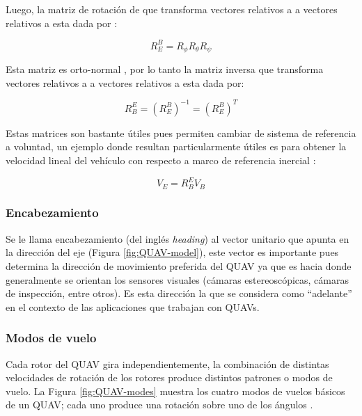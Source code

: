 Luego, la matriz de rotación  de que transforma vectores relativos a  a vectores relativos a  esta dada por \cite{multidrone2015modeling}:


\begin{equation}
    \label{eq:euler-transform}
    R_{E}^{B} = R_{\phi}R_{\theta}R_{\psi}
\end{equation}

Esta matriz es orto-normal \cite{eulerAngles}, por lo tanto la matriz inversa  que transforma vectores relativos a  a vectores relativos a  esta dada por:


\begin{equation}
    \label{eq:euler-transform-2}
    R_{B}^{E} = (R_{E}^{B})^{-1} = (R_{E}^{B})^{T}
\end{equation}

Estas matrices son bastante útiles pues permiten cambiar de sistema de referencia a voluntad, un ejemplo donde resultan particularmente útiles es para obtener la velocidad lineal del vehículo con respecto a marco de referencia inercial :

\begin{equation}
    \label{eq:velocity-world}
    V_{E} = R_{B}^{E} V_{B}
\end{equation}

\subsubsection*{Encabezamiento}

Se le llama encabezamiento (del inglés \textit{heading}) al vector unitario que apunta en la dirección del eje  (Figura \ref{fig:QUAV-model}), este vector es importante pues determina la dirección de movimiento preferida del QUAV ya que es hacia donde generalmente se orientan los sensores visuales (cámaras estereoscópicas, cámaras de inspección, entre otros). Es esta dirección la que se considera como ``adelante'' en el contexto de las aplicaciones que trabajan con QUAVs.

\subsubsection*{Modos de vuelo}

Cada rotor del QUAV gira independientemente, la combinación de distintas velocidades de rotación de los rotores produce distintos patrones o modos de vuelo. La Figura \ref{fig:QUAV-modes} muestra los cuatro modos de vuelos básicos de un QUAV; cada uno produce una rotación sobre uno de los ángulos \jim{\phi,\theta,\psi}.

